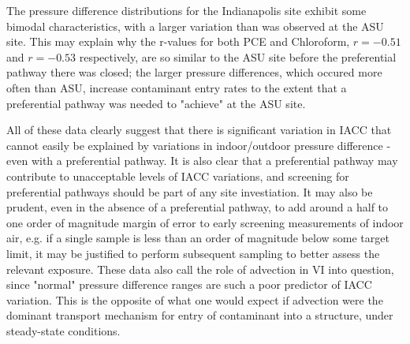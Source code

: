 \documentclass[journal=esthag,manuscript=article]{achemso}
\begin{document}
The pressure difference distributions for the Indianapolis site exhibit some bimodal characteristics, with a larger variation than was observed at the ASU site.
This may explain why the r-values for both PCE and Chloroform, $r=-0.51$ and $r=-0.53$ respectively, are so similar to the ASU site before the preferential pathway there was closed; the larger pressure differences, which occured more often than ASU, increase contaminant entry rates to the extent that a preferential pathway was needed to "achieve" at the ASU site.\par
All of these data clearly suggest that there is significant variation in IACC that cannot easily be explained by variations in indoor/outdoor pressure difference - even with a preferential pathway.
It is also clear that a preferential pathway may contribute to unacceptable levels of IACC variations, and screening for preferential pathways should be part of any site investiation.
It may also be prudent, even in the absence of a preferential pathway, to add around a half to one order of magnitude margin of error to early screening measurements of indoor air, e.g. if a single sample is less than an order of magnitude below some target limit, it may be justified to perform subsequent sampling to better assess the relevant exposure.
These data also call the role of advection in VI into question, since "normal" pressure difference ranges are such a poor predictor of IACC variation.
This is the opposite of what one would expect if advection were the dominant transport mechanism for entry of contaminant into a structure, under steady-state conditions.\par
\end{document}
